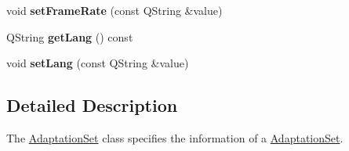 \begin{DoxyCompactItemize}
\item 
\hypertarget{class_adaptation_set_a8d44bf7f62a7ee63cbbe3da0dbd398c4}{void {\bfseries set\-Frame\-Rate} (const Q\-String \&value)}\label{class_adaptation_set_a8d44bf7f62a7ee63cbbe3da0dbd398c4}

\item 
\hypertarget{class_adaptation_set_aa92058bedd99969d4390985402986a26}{Q\-String {\bfseries get\-Lang} () const }\label{class_adaptation_set_aa92058bedd99969d4390985402986a26}

\item 
\hypertarget{class_adaptation_set_a28efc20a1fef4f7be67a17feee3a08fc}{void {\bfseries set\-Lang} (const Q\-String \&value)}\label{class_adaptation_set_a28efc20a1fef4f7be67a17feee3a08fc}

\end{DoxyCompactItemize}


\subsection{Detailed Description}
The \hyperlink{class_adaptation_set}{Adaptation\-Set} class specifies the information of a \hyperlink{class_adaptation_set}{Adaptation\-Set}. 


